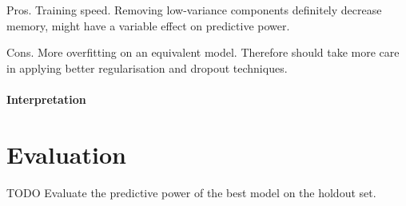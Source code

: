 \documentclass[10pt, twocolumn]{article}
\begin{document}
Pros. Training speed. Removing low-variance components definitely decrease memory, might have a variable effect on predictive power.

Cons. More overfitting on an equivalent model. Therefore should take more care in applying better regularisation and dropout techniques. 
\paragraph{Interpretation}

\section{Evaluation}
TODO Evaluate the predictive power of the best model on the holdout set.


\medskip
 


\end{document}
